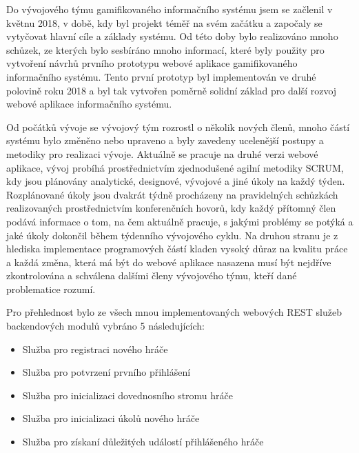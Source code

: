 \documentclass[12pt]{article}
\begin{document}
{\cite{springbootDocs}



Do vývojového týmu gamifikovaného informačního systému jsem se začlenil v květnu 2018,
v době, kdy byl projekt téměř na svém začátku a započaly se vytyčovat hlavní cíle a základy systému.
Od této doby bylo realizováno mnoho schůzek, ze kterých bylo sesbíráno mnoho informací,
které byly použity pro vytvoření návrhů prvního prototypu webové aplikace gamifikovaného informačního systému.
Tento první prototyp byl implementován ve druhé polovině roku 2018 a byl tak vytvořen poměrně solidní základ
pro další rozvoj webové aplikace informačního systému.

Od počátků vývoje se vývojový tým rozrostl o několik nových členů,
mnoho částí systému bylo změněno nebo upraveno a byly zavedeny ucelenější postupy
a metodiky pro realizaci vývoje.
Aktuálně se pracuje na druhé verzi webové aplikace, vývoj probíhá prostřednictvím
zjednodušené agilní metodiky SCRUM, kdy jsou plánovány analytické, designové, vývojové a jiné
úkoly na každý týden. Rozplánované úkoly jsou dvakrát týdně procházeny na pravidelných schůzkách
realizovaných prostřednictvím konferenčních hovorů, kdy každý přítomný člen podává informace
o tom, na čem aktuálně pracuje, s jakými problémy se potýká a jaké úkoly dokončil během týdenního vývojového cyklu.
Na druhou stranu je z hlediska implementace programových částí kladen vysoký důraz na kvalitu práce
a každá změna, která má být do webové aplikace nasazena musí být nejdříve zkontrolována a schválena dalšími
členy vývojového týmu, kteří dané problematice rozumí.

Pro přehlednost bylo ze všech mnou implementovaných webových
REST služeb backendových modulů vybráno 5 následujících:

\begin{itemize}
\item Služba pro registraci nového hráče
\item Služba pro potvrzení prvního přihlášení
\item Služba pro inicializaci dovednosního stromu hráče
\item Služba pro inicializaci úkolů nového hráče
\item Služba pro získaní důležitých událostí přihlášeného hráče
\end{itemize}

}
\end{document}
